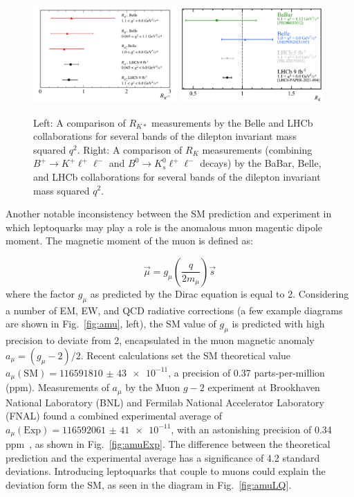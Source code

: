 \begin{figure}[H]
    \centering
    \includegraphics[width=0.49\textwidth]{Images/LHCbBelle.png}
    \includegraphics[width=0.49\textwidth]{Images/RKmeasurements.png}
    \caption{Left: A comparison of $R_{K*}$ measurements by the Belle and LHCb collaborations for several bands of the dilepton invariant mass squared $q^2$. Right: A comparison of $R_K$ measurements (combining $B^+\rightarrow K^+\ell^+\ell^-$ and $B^0\rightarrow K^0_s\ell^+\ell^-$ decays) by the BaBar, Belle, and LHCb collaborations for several bands of the dilepton invariant mass squared $q^2$.}
    \label{fig:FlavorAnomalies}
\end{figure}


Another notable inconsistency between the SM prediction and experiment in which leptoquarks may play a role is the anomalous muon magentic dipole moment. The magnetic moment of the muon is defined as:

\begin{equation}
    \vec{\mu} = g_{\mu}\left(\frac{q}{2m_{\mu}}\right)\vec{s}
\end{equation}
where the factor $g_{\mu}$ as predicted by the Dirac equation is equal to 2. Considering a number of EM, EW, and QCD radiative corrections (a few example diagrams are shown in Fig.~\ref{fig:amu}, left), the SM value of $g_{\mu}$ is predicted with high precision to deviate from 2, encapsulated in the muon magnetic anomaly $a_{\mu} = (g_{\mu}-2)/2$. Recent calculations set the SM theoretical value $a_{\mu}(\mathrm{SM})=\num{116591810(43)e-11}$, a precision of 0.37 parts-per-million (ppm). Measurements of $a_{\mu}$ by the Muon $g-2$ experiment at Brookhaven National Laboratory (BNL) and Fermilab National Accelerator Laboratory (FNAL) found a combined experimental average of $a_{\mu}(\mathrm{Exp}) = \num{116592061(41)e-11}$, with an astonishing precision of 0.34 ppm~\cite{Muongminus2}, as shown in Fig.~\ref{fig:amuExp}. The difference between the theoretical prediction and the experimental average has a significance of 4.2 standard deviations. Introducing leptoquarks that couple to muons could explain the deviation form the SM, as seen in the diagram in Fig.~\ref{fig:amuLQ}.


